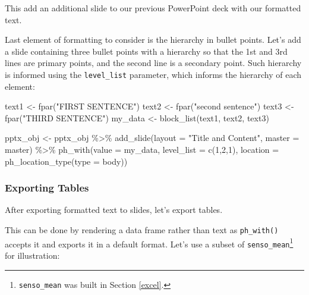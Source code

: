 \documentclass[
]{krantz}
\makeatletter
\newenvironment{Shaded}{\begin{snugshade}}{\end{snugshade}}
\newcommand{\AttributeTok}[1]{\textcolor[rgb]{0.61,0.61,0.61}{#1}}
\newcommand{\DecValTok}[1]{\textcolor[rgb]{0.06,0.06,0.06}{#1}}
\newcommand{\FunctionTok}[1]{\textcolor[rgb]{0,0,0}{#1}}
\newcommand{\NormalTok}[1]{#1}
\newcommand{\OtherTok}[1]{\textcolor[rgb]{0.37,0.37,0.37}{#1}}
\newcommand{\SpecialCharTok}[1]{\textcolor[rgb]{0,0,0}{#1}}
\newcommand{\StringTok}[1]{\textcolor[rgb]{0.5,0.5,0.5}{#1}}
\newenvironment{kframe}{%
\medskip{}
\setlength{\fboxsep}{.8em}
 \def\at@end@of@kframe{}%
 \ifinner\ifhmode%
  \def\at@end@of@kframe{\end{minipage}}%
  \begin{minipage}{\columnwidth}%
 \fi\fi%
 \def\FrameCommand##1{\hskip\@totalleftmargin \hskip-\fboxsep
 \colorbox{shadecolor}{##1}\hskip-\fboxsep
     \hskip-\linewidth \hskip-\@totalleftmargin \hskip\columnwidth}%
 \MakeFramed {\advance\hsize-\width
   \@totalleftmargin\z@ \linewidth\hsize
   \@setminipage}}%
 {\par\unskip\endMakeFramed%
 \at@end@of@kframe}
\renewenvironment{Shaded}{\begin{kframe}}{\end{kframe}}
\makeatother
\begin{document}
This add an additional slide to our previous PowerPoint deck with our formatted text.

Last element of formatting to consider is the hierarchy in bullet points. Let's add a slide containing three bullet points with a hierarchy so that the 1st and 3rd lines are primary points, and the second line is a secondary point. Such hierarchy is informed using the \texttt{level\_list} parameter, which informs the hierarchy of each element:

\begin{Shaded}
\begin{Highlighting}[]
\NormalTok{text1 }\OtherTok{\textless{}{-}} \FunctionTok{fpar}\NormalTok{(}\StringTok{"FIRST SENTENCE"}\NormalTok{)}
\NormalTok{text2 }\OtherTok{\textless{}{-}} \FunctionTok{fpar}\NormalTok{(}\StringTok{"second sentence"}\NormalTok{)}
\NormalTok{text3 }\OtherTok{\textless{}{-}} \FunctionTok{fpar}\NormalTok{(}\StringTok{"THIRD SENTENCE"}\NormalTok{)}
\NormalTok{my\_data }\OtherTok{\textless{}{-}} \FunctionTok{block\_list}\NormalTok{(text1, text2, text3)}

\NormalTok{pptx\_obj }\OtherTok{\textless{}{-}}\NormalTok{ pptx\_obj }\SpecialCharTok{\%\textgreater{}\%}
  \FunctionTok{add\_slide}\NormalTok{(}\AttributeTok{layout =} \StringTok{"Title and Content"}\NormalTok{, }\AttributeTok{master =}\NormalTok{ master) }\SpecialCharTok{\%\textgreater{}\%} 
  \FunctionTok{ph\_with}\NormalTok{(}\AttributeTok{value =}\NormalTok{ my\_data, }\AttributeTok{level\_list =} \FunctionTok{c}\NormalTok{(}\DecValTok{1}\NormalTok{,}\DecValTok{2}\NormalTok{,}\DecValTok{1}\NormalTok{), }
          \AttributeTok{location =} \FunctionTok{ph\_location\_type}\NormalTok{(}\AttributeTok{type =} \StringTok{\textquotesingle{}body\textquotesingle{}}\NormalTok{))}
\end{Highlighting}
\end{Shaded}

\hypertarget{exporting-tables}{%
\subsubsection*{Exporting Tables}\label{exporting-tables}}


After exporting formatted text to slides, let's export tables.

This can be done by rendering a data frame rather than text as \texttt{ph\_with()} accepts it and exports it in a default format. Let's use a subset of \texttt{senso\_mean}\footnote{\texttt{senso\_mean} was built in Section \ref{excel}.} for illustration:
\end{document}
